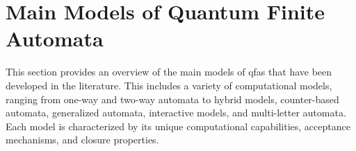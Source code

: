 \section{Main Models of Quantum Finite Automata}
\label{sec:main-models}
This section provides an overview of the main models of \glspl{qfa} that have been developed in the literature. 
This includes a variety of computational models, ranging from one-way and two-way automata to hybrid models, counter-based automata, generalized automata, interactive models, and multi-letter automata.
Each model is characterized by its unique computational capabilities, acceptance mechanisms, and closure properties.









